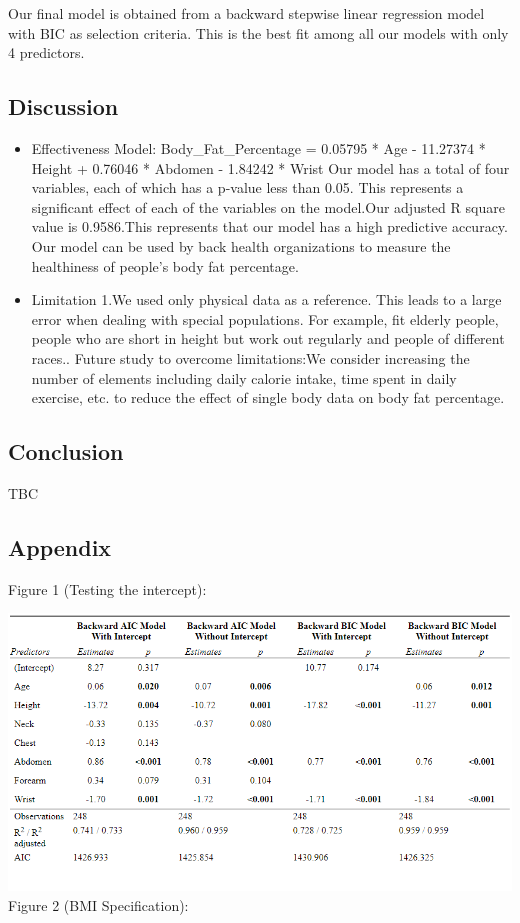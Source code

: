\documentclass[letterpaper,9pt,twocolumn,twoside,]{pinp}
\begin{document}
Our final model is obtained from a backward stepwise linear regression
model with BIC as selection criteria. This is the best fit among all our
models with only 4 predictors.

\hypertarget{discussion}{%
\subsection{Discussion}\label{discussion}}

\begin{itemize}
\item
  Effectiveness Model: Body\_Fat\_Percentage = 0.05795 * Age - 11.27374
  * Height + 0.76046 * Abdomen - 1.84242 * Wrist Our model has a total
  of four variables, each of which has a p-value less than 0.05. This
  represents a significant effect of each of the variables on the
  model.Our adjusted R square value is 0.9586.This represents that our
  model has a high predictive accuracy. Our model can be used by back
  health organizations to measure the healthiness of people's body fat
  percentage.
\item
  Limitation 1.We used only physical data as a reference. This leads to
  a large error when dealing with special populations. For example, fit
  elderly people, people who are short in height but work out regularly
  and people of different races.. Future study to overcome
  limitations:We consider increasing the number of elements including
  daily calorie intake, time spent in daily exercise, etc. to reduce the
  effect of single body data on body fat percentage.
\end{itemize}

\hypertarget{conclusion}{%
\subsection{Conclusion}\label{conclusion}}

TBC

\hypertarget{appendix}{%
\subsection{Appendix}\label{appendix}}

Figure 1 (Testing the intercept):

\includegraphics{images/intercepttest.png} Figure 2 (BMI Specification):
\end{document}
